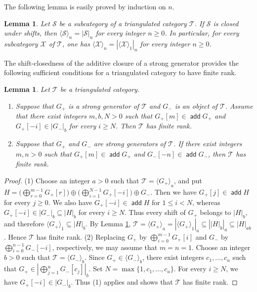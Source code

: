 \documentclass[10pt]{amsart}
\newtheorem{lem}[thm]{Lemma}
\theoremstyle{definition}
\theoremstyle{remark}
\numberwithin{equation}{thm}
\def\add{\operatorname{\mathsf{add}}}
\def\ge{\geqslant}
\def\le{\leqslant}
\def\max{\operatorname{max}}
\def\S{\mathcal{S}}
\def\T{\mathcal{T}}
\def\X{\mathcal{X}}
\begin{document}
The following lemma is easily proved by induction on $n$.
\begin{lem}\label{lem_shiftclosed}
Let $\S$ be a subcategory of a triangulated category $\T$. 
If $\S$ is closed under shifts, then ${\langle\S\rangle}_{n}={|\S|}_{n}$ for every integer $n\ge0$. 
In particular, for every subcategory $\X$ of $\T$, one has ${\langle\X\rangle}_{n}={|{\langle\X\rangle}_{1}|}_{n}$ for every integer $n\ge0$.
\end{lem}
The shift-closedness of the additive closure of a strong generator provides the following sufficient conditions for a triangulated category to have finite rank.
\begin{lem}\label{lem_addshift}
Let $\T$ be a triangulated category.
\begin{enumerate}[\rm(1)]
\item 
Suppose that $G_{+}$ is a strong generator of $\T$ and $G_{-}$ is an object of $\T$. 
Assume that there exist integers $m,b,N>0$ such that $G_{+}[m]\in\add G_{+}$ and $G_{+}[-i]\in{|G_{-}|}_{b}$ for every $i\ge N$. Then $\T$ has finite rank.
\item 
Suppose that $G_{+}$ and $G_{-}$ are strong generators of $\T$. If there exist integers $m,n>0$ such that $G_{+}[m]\in\add G_{+}$ and $G_{-}[-n]\in\add G_{-}$, then $\T$ has finite rank.
\end{enumerate}
\end{lem}
\begin{proof}
(1) Choose an integer $a>0$ such that $\T={\langle G_{+}\rangle}_{a}$, and put $H=\bigl(\bigoplus_{r=0}^{m-1}G_{+}[r]\bigr)\oplus\bigl(\bigoplus_{i=1}^{N-1}G_{+}[-i]\bigr)\oplus G_{-}$. 
Then we have $G_{+}[j]\in\add H$ for every $j\ge0$. 
We also have $G_{+}[-i]\in\add H$ for $1\le i<N$, whereas $G_{+}[-i]\in{|G_{-}|}_{b}\subseteq{|H|}_{b}$ for every $i\ge N$. 
Thus every shift of $G_{+}$ belongs to ${|H|}_{b}$, and therefore ${\langle G_{+}\rangle}_{1}\subseteq{|H|}_{b}$. 
By Lemma \ref{lem_shiftclosed}, $\T={\langle G_{+}\rangle}_{a}={|{\langle G_{+}\rangle}_{1}|}_{a}\subseteq{|{|H|}_{b}|}_{a}\subseteq{|H|}_{ab}$. 
Hence $\T$ has finite rank.
(2) Replacing $G_{+}$ by $\bigoplus_{i=0}^{m-1}G_{+}[i]$ and $G_{-}$ by $\bigoplus_{i=0}^{n-1}G_{-}[-i]$, respectively, we may assume that $m=n=1$. 
Choose an integer $b>0$ such that $\T={\langle G_{-}\rangle}_{b}$. 
Since $G_{+}\in{\langle G_{-}\rangle}_{b}$, there exist integers $c_{1},\ldots,c_{u}$ such that $G_{+}\in{|\bigoplus_{j=1}^{u}G_{-}[c_{j}]|}_{b}$. 
Set $N=\max\{1,c_{1},\ldots,c_{u}\}$. 
For every $i\ge N$, we have $G_{+}[-i]\in{|G_{-}|}_{b}$. 
Thus (1) applies and shows that $\T$ has finite rank.
\end{proof}
\end{document}
